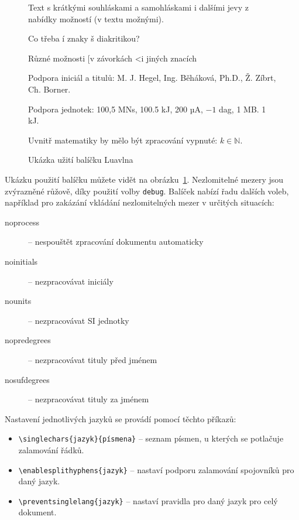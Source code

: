 \documentclass{csbulletin}
\begin{document}
\begin{figure}
  \begin{minipage}{3in}

    \preventsingledebugon

    Text s krátkými souhláskami a samohláskami i dalšími jevy
    z nabídky možností (v textu možnými).

    Co třeba í znaky š diakritikou?

    Různé možnosti [v závorkách \textless i jiných znacích

    Podpora iniciál a titulů: M. J. Hegel, Ing. Běháková, Ph.D., Ž. Zíbrt,
    Ch. Borner.

    Podpora jednotek: 100,5 MN\cdot{}s, 100.5 kJ, 200 µA, $-1$ dag, 1 MB. 1 kJ.

    Uvnitř matematiky by mělo být zpracování vypnuté: $k \in \mathbb N$.

    \preventsingledebugoff
  \end{minipage}
  \caption{Ukázka užití balíčku Luavlna}\label{fig:luavlna}
\end{figure}

Ukázku použití balíčku můžete vidět na obrázku~\ref{fig:luavlna}. Nezlomitelné
mezery jsou zvýrazněné růžově, díky použití volby \texttt{debug}. Balíček
nabízí řadu dalších voleb, například pro zakázání vkládání nezlomitelných 
mezer v určitých situacích:

\begin{description}
  \item [noprocess] – nespouštět zpracování dokumentu automaticky
  \item [noinitials] – nezpracovávat iniciály
  \item [nounits] – nezpracovávat SI jednotky
  \item [nopredegrees] – nezpracovávat tituly před jménem
  \item [nosufdegrees] – nezpracovávat tituly za jménem
\end{description}

Nastavení jednotlivých jazyků se provádí pomocí těchto příkazů:

  \begin{itemize}
    \item\verb|\singlechars{jazyk}{písmena}| – seznam písmen, u kterých se potlačuje zalamování řádků.

    \item\verb|\enablesplithyphens{jazyk}| –  nastaví podporu zalamování spojovníků pro daný jazyk.
    \item\verb|\preventsinglelang{jazyk}| – nastaví pravidla pro daný jazyk pro celý dokument.
  \end{itemize}
\end{document}
